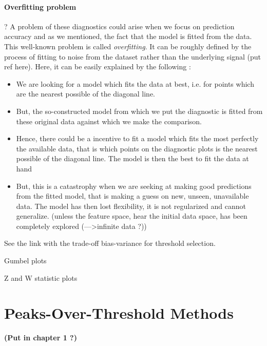 \documentclass[11pt,a4paper,openany ]{book}
\begin{document}
\subsubsection*{Overfitting problem} \cite{northrop_cross_2016}?
A problem of these diagnostics could arise when we focus on prediction accuracy and as we mentioned, the fact that the model is fitted from the data. This well-known problem is called \emph{overfitting}. It can be roughly defined by the process of fitting to noise from the dataset rather than the underlying signal (put ref here). Here, it can be easily explained by the following :
\begin{itemize}
	
	\item We are looking for a model which fits the data at best, i.e. for points which are the nearest possible of the diagonal line.
	
	\item But, the so-constructed model from which we put the diagnostic is fitted from these original data against which we make the comparison.
	
	\item Hence, there could be a incentive to fit a model which fits the most perfectly the available data, that is which points on the diagnostic plots is the nearest possible of the diagonal line. The model is then the best to fit the data at hand
	
	\item But, this is a catastrophy when we are seeking at making good predictions from the fitted model, that is making a guess on new, unseen, unavailable data. The model has then lost flexibility, it is not regularized and cannot generalize. (unless the feature space, hear the initial data space, has been completely explored (--->infinite data ?))
\end{itemize}
See the link with the trade-off bias-variance for threshold selection.



Gumbel plots

Z and W statistic plots



\chapter{Peaks-Over-Threshold Methods}\label{sec::2}
\vspace{-1cm}
\minitoc \thispagestyle{empty}
 \vspace{1.5cm}
\textbf{(Put in chapter 1 ?)}
\end{document}
